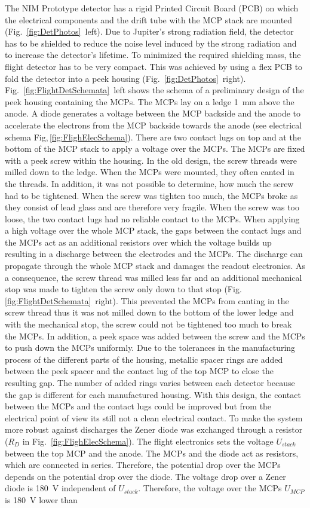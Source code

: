 	The NIM Prototype detector has a rigid Printed Circuit Board (PCB) on which the electrical components and the drift tube with the MCP stack are mounted (Fig.~\ref{fig:DetPhotos}~left). Due to Jupiter's strong radiation field, the detector has to be shielded to reduce the noise level induced by the strong radiation and to increase the detector's lifetime. To minimized the required shielding mass, the flight detector has to be very compact. This was achieved by using a flex PCB to fold the detector into a peek housing (Fig.~\ref{fig:DetPhotos}~right). Fig.~\ref{fig:FlightDetSchemata}~left shows the schema of a preliminary design of the peek housing containing the MCPs. The MCPs lay on a ledge 1~mm above the anode. A diode generates a voltage between the MCP backside and the anode to accelerate the electrons from the MCP backside towards the anode (see electrical schema Fig,\,\ref{fig:FlighElecSchema}). There are two contact lugs on top and at the bottom of the MCP stack to apply a voltage over the MCPs. The MCPs are fixed with a peek screw within the housing. In the old design, the screw threads were milled down to the ledge. When the MCPs were mounted, they often canted in the threads. In addition, it was not possible to determine, how much the screw had to be tightened. When the screw was tighten too much, the MCPs broke as they consist of lead glass and are therefore very fragile. When the screw was too loose, the two contact lugs had no reliable contact to the MCPs. When applying a high voltage over the whole MCP stack, the gaps between the contact lugs and the MCPs act as an additional resistors over which the voltage builds up resulting in a discharge between the electrodes and the MCPs. The discharge can propagate through the whole MCP stack and damages the readout electronics. As a consequence, the screw thread was milled less far and an additional mechanical stop was made to tighten the screw only down to that stop (Fig.\,\ref{fig:FlightDetSchemata}~right). This prevented the MCPs from canting in the screw thread thus it was not milled down to the bottom of the lower ledge and with the mechanical stop, the screw could not be tightened too much to break the MCPs. In addition, a peek space was added between the screw and the MCPs to push down the MCPs uniformly. Due to the tolerances in the manufacturing process of the different parts of the housing, metallic spacer rings are added between the peek spacer and the contact lug of the top MCP to close the resulting gap. The number of added rings varies between each detector because the gap is different for each manufactured housing. With this design, the contact between the MCPs and the contact lugs could be improved but from the electrical point of view its still not a clean electrical contact. To make the system more robust against discharges the Zener diode was exchanged through a resistor ($R_D$ in Fig.~\ref{fig:FlighElecSchema}). The flight electronics sets the voltage $U_{stack}$ between the top MCP and the anode. The MCPs and the diode act as resistors, which are connected in series. Therefore, the potential drop over the MCPs depends on the potential drop over the diode. The voltage drop over a Zener diode is 180~V independent of $U_{stack}$. Therefore, the voltage over the MCPs $U_{MCP}$ is 180~V lower than 